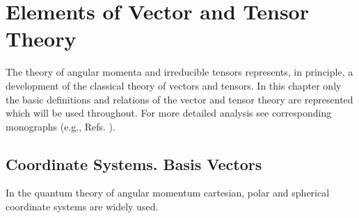 \chapter{Elements of Vector and Tensor Theory}\label{chap:1}
The theory of angular momenta and irreducible tensors represents, in principle, a development of the classical theory of vectors and tensors. In this chapter only the basic definitions and relations of the vector and tensor theory are represented which will be used throughout. For more detailed analysis see corresponding monographs (e.g., Refs. \cite{ref011, ref034, ref035}).

\section{Coordinate Systems. Basis Vectors}\label{sec:1.1}
In the quantum theory of angular momentum cartesian, polar and spherical coordinate systems are widely used.

